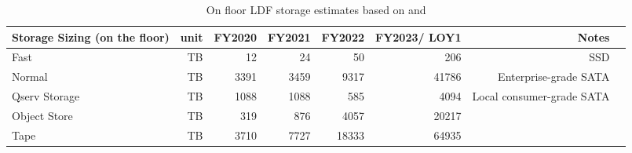 \tiny \begin{longtable} { |p{}  |r  |r  |r  |r  |r  |r  |r |} 
\caption{On floor LDF storage estimates based on  and 
 \label{tab:storageFloor}}\\ 
\hline 
\textbf{Storage Sizing (on the floor)}&\textbf{unit}&\textbf{FY2020}&\textbf{FY2021}&\textbf{FY2022}&\textbf{FY2023/ LOY1}&\textbf{Notes} \\ \hline
{Fast}&{TB}&{12}&{24}&{50}&{206}&{SSD} \\ \hline
{Normal}&{TB}&{3391}&{3459}&{9317}&{41786}&{Enterprise-grade SATA} \\ \hline
{Qserv Storage}&{TB}&{1088}&{1088}&{585}&{4094}&{Local consumer-grade SATA} \\ \hline
{Object Store}&{TB}&{319}&{876}&{4057}&{20217}& \\ \hline
{Tape}&{TB}&{3710}&{7727}&{18333}&{64935}& \\ \hline
\end{longtable} \normalsize
